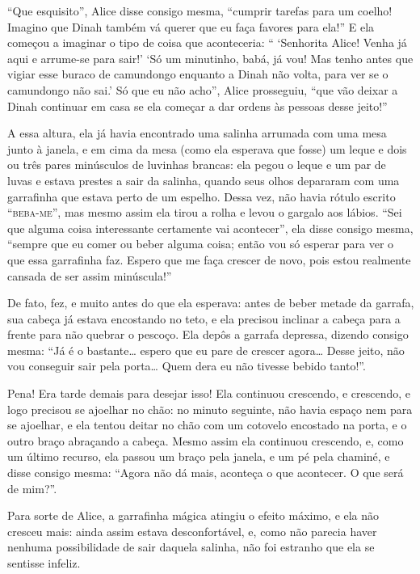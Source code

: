 ``Que esquisito'', Alice disse consigo mesma, ``cumprir tarefas para um
coelho! Imagino que Dinah também vá querer que eu faça favores para
ela!'' E ela começou a imaginar o tipo de coisa que aconteceria: ``
`Senhorita Alice! Venha já aqui e arrume-se para sair!' `Só um
minutinho, babá, já vou! Mas tenho antes que vigiar esse buraco de
camundongo enquanto a Dinah não volta, para ver se o camundongo não
sai.' Só que eu não acho'', Alice prosseguiu, ``que vão deixar a Dinah
continuar em casa se ela começar a dar ordens às pessoas desse jeito!''

A essa altura, ela já havia encontrado uma salinha arrumada com uma mesa
junto à janela, e em cima da mesa (como ela esperava que fosse) um leque
e dois ou três pares minúsculos de luvinhas brancas: ela pegou o leque e
um par de luvas e estava prestes a sair da salinha, quando seus olhos
depararam com uma garrafinha que estava perto de um espelho. Dessa vez,
não havia rótulo escrito ``\textsc{beba-me}'', mas mesmo assim ela tirou a rolha
e levou o gargalo aos lábios. ``Sei que alguma coisa interessante
certamente vai acontecer'', ela disse consigo mesma, ``sempre que eu
comer ou beber alguma coisa; então vou só esperar para ver o que essa
garrafinha faz. Espero que me faça crescer de novo, pois estou realmente
cansada de ser assim minúscula!''

De fato, fez, e muito antes do que ela esperava: antes de beber metade
da garrafa, sua cabeça já estava encostando no teto, e ela precisou
inclinar a cabeça para a frente para não quebrar o pescoço. Ela depôs a
garrafa depressa, dizendo consigo mesma: ``Já é o bastante\ldots{} espero que
eu pare de crescer agora\ldots{} Desse jeito, não vou conseguir sair pela
porta\ldots{} Quem dera eu não tivesse bebido tanto!''.

Pena! Era tarde demais para desejar isso! Ela continuou crescendo, e
crescendo, e logo precisou se ajoelhar no chão: no minuto seguinte, não
havia espaço nem para se ajoelhar, e ela tentou deitar no chão com um
cotovelo encostado na porta, e o outro braço abraçando a cabeça. Mesmo
assim ela continuou crescendo, e, como um último recurso, ela passou um
braço pela janela, e um pé pela chaminé, e disse consigo mesma: ``Agora
não dá mais, aconteça o que acontecer. O que será de mim?''.

Para sorte de Alice, a garrafinha mágica atingiu o efeito máximo, e ela
não cresceu mais: ainda assim estava desconfortável, e, como não parecia
haver nenhuma possibilidade de sair daquela salinha, não foi estranho
que ela se sentisse infeliz.

